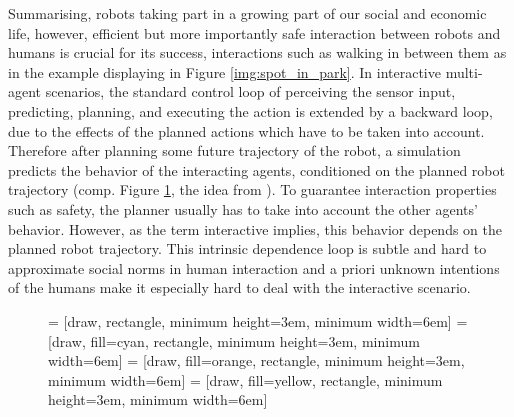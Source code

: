 Summarising, robots taking part in a growing part of our social and economic life, however, efficient but more importantly safe interaction between robots and humans is crucial for its success, interactions such as walking in between them as in the example displaying in Figure \ref{img:spot_in_park}.
\newline
In interactive multi-agent scenarios, the standard control loop of perceiving the sensor input, predicting, planning, and executing the action \cite{Siegwart2011} is extended by a backward loop, due to the effects of the planned actions which have to be taken into account. Therefore after planning some future trajectory of the robot, a simulation predicts the behavior of the interacting agents, conditioned on the planned robot trajectory (comp. Figure \ref{fig:control_loop_interactive}, the idea from \cite{Romanski2019}). To guarantee interaction properties such as safety, the planner usually has to take into account the other agents' behavior. However, as the term interactive implies, this behavior depends on the planned robot trajectory. This intrinsic dependence loop is subtle and hard to approximate social norms in human interaction and a priori unknown intentions of the humans make it especially hard to deal with the interactive scenario. 

\begin{figure}
\begin{center}
 = [draw, rectangle, minimum height=3em, minimum width=6em]
 = [draw, fill=cyan, rectangle, minimum height=3em, minimum width=6em]
 = [draw, fill=orange, rectangle, minimum height=3em, minimum width=6em]
 = [draw, fill=yellow, rectangle, minimum height=3em, minimum width=6em]
\label{fig:control_loop_interactive}
\end{center}
\end{figure}

